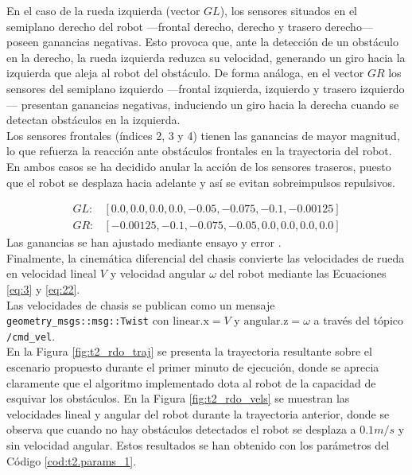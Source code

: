 En el caso de la rueda izquierda (vector $GL$), los sensores situados en el
semiplano derecho del robot —frontal derecho, derecho y trasero derecho— poseen
ganancias negativas. Esto provoca que, ante la detección de un obstáculo en la 
derecho, la rueda izquierda reduzca su velocidad, generando un giro hacia la izquierda 
que aleja al robot del obstáculo. De forma análoga, en el vector $GR$ los sensores del
semiplano izquierdo —frontal izquierda, izquierdo y trasero izquierdo— presentan
ganancias negativas, induciendo un giro hacia la derecha cuando se detectan obstáculos
en la izquierda. \\

Los sensores frontales (índices 2, 3 y 4) tienen las ganancias de mayor magnitud,
lo que refuerza la reacción ante obstáculos frontales en la trayectoria del robot. 
En ambos casos se ha decidido anular la acción de los sensores traseros, puesto que 
el robot se desplaza hacia adelante y así se evitan sobreimpulsos repulsivos.

\begin{equation}
\begin{aligned}
GL: &[0.0,0.0,0.0,0.0,-0.05,-0.075,-0.1,-0.00125] \\
GR: &[-0.00125,-0.1,-0.075,-0.05,0.0,0.0,0.0,0.0]
\end{aligned}
\label{eq:ganancias}
\end{equation} 
Las ganancias se han ajustado mediante ensayo y error \cite{braitenberg_video}. \\

Finalmente, la cinemática diferencial del chasis convierte las velocidades
de rueda en velocidad lineal \(V\) y velocidad angular \(\omega\) del robot mediante
las Ecuaciones \ref{eq:3} y \ref{eq:22}. \\

Las velocidades de chasis se publican como un mensaje \texttt{geometry\_msgs::msg::Twist} 
con \(\text{linear.x}=V\) y \(\text{angular.z}=\omega\) a través del tópico \texttt{/cmd\_vel}. \\

En la Figura \ref{fig:t2_rdo_traj} se presenta la trayectoria resultante sobre el escenario 
propuesto durante el primer minuto de ejecución, donde se aprecia claramente que el 
algoritmo implementado dota al robot de la capacidad de esquivar los obstáculos.
En la Figura \ref{fig:t2_rdo_vels} se muestran las velocidades lineal y angular del robot
durante la trayectoria anterior, donde se observa que cuando no hay obstáculos detectados
el robot se desplaza a $0.1 m/s$ y sin velocidad angular. Estos resultados se han 
obtenido con los parámetros del Código \ref{cod:t2.params_1}. \\


